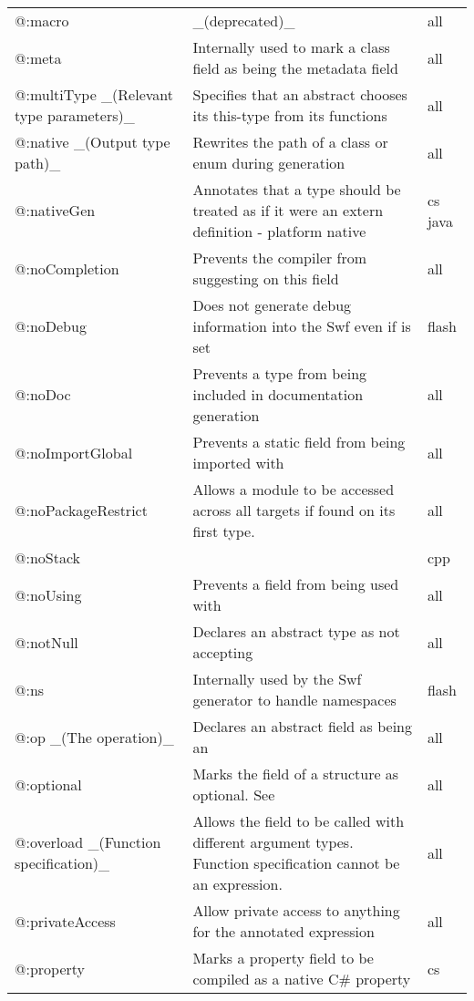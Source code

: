 \begin{center}
\begin{tabular}{| l | l | l |}
	@:macro  &  \_(deprecated)\_  &  all \\
	@:meta   &  Internally used to mark a class field as being the metadata field  &  all \\
	@:multiType \_(Relevant type parameters)\_  &  Specifies that an abstract chooses its this-type from its \expr{@:to} functions  &  all \\
	@:native \_(Output type path)\_  &  Rewrites the path of a class or enum during generation  &  all \\
	@:nativeGen  &  Annotates that a type should be treated as if it were an extern definition - platform native  &  cs  java \\
	@:noCompletion  &  Prevents the compiler from suggesting \tref{completion}{cr-completion} on this field  &  all \\
	@:noDebug &  Does not generate debug information into the Swf even if \expr{-debug} is set   &  flash \\
	@:noDoc  &  Prevents a type from being included in documentation generation  &  all \\
	@:noImportGlobal  &  Prevents a static field from being imported with \expr{import Class.*}  &  all \\
	@:noPackageRestrict  &  Allows a module to be accessed across all targets if found on its first type.  &  all \\
	@:noStack &     &  cpp \\
	@:noUsing &  Prevents a field from being used with \expr{using}  &  all \\
	@:notNull &  Declares an abstract type as not accepting \tref{\expr{null} values}{types-nullability}  &  all \\
	@:ns  &  Internally used by the Swf generator to handle namespaces   &  flash \\
	@:op \_(The operation)\_  &   Declares an abstract field as being an \tref{operator overload}{types-abstract-operator-overloading}  &  all \\
	@:optional  &  Marks the field of a structure as optional. See \tref{Optional Arguments}{types-nullability-optional-arguments}  &  all \\
	@:overload \_(Function specification)\_  &  Allows the field to be called with different argument types. Function specification cannot be an expression.  &  all \\
	@:privateAccess  &  Allow private access to anything for the annotated expression  &  all \\
	@:property  &  Marks a property field to be compiled as a native C\# property   &  cs \\

\end{tabular}
\end{center}
